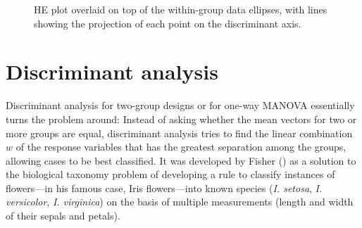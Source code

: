 \documentclass[
  letterpaper,
  10pt,
  krantz2]{krantz}
\makeatletter
\newenvironment{Shaded}{\begin{snugshade}}{\end{snugshade}}
\newcommand{\AttributeTok}[1]{\textcolor[rgb]{0.40,0.45,0.13}{#1}}
\newcommand{\ControlFlowTok}[1]{\textcolor[rgb]{0.00,0.23,0.31}{\textbf{#1}}}
\newcommand{\DecValTok}[1]{\textcolor[rgb]{0.68,0.00,0.00}{#1}}
\newcommand{\FloatTok}[1]{\textcolor[rgb]{0.68,0.00,0.00}{#1}}
\newcommand{\FunctionTok}[1]{\textcolor[rgb]{0.28,0.35,0.67}{#1}}
\newcommand{\NormalTok}[1]{\textcolor[rgb]{0.00,0.23,0.31}{#1}}
\newcommand{\OtherTok}[1]{\textcolor[rgb]{0.00,0.23,0.31}{#1}}
\newcommand{\SpecialCharTok}[1]{\textcolor[rgb]{0.37,0.37,0.37}{#1}}
\newcommand{\StringTok}[1]{\textcolor[rgb]{0.13,0.47,0.30}{#1}}
\newenvironment{kframe}{%
  \medskip{}
  \setlength{\fboxsep}{.8em}
  \def\at@end@of@kframe{}%
  \ifinner\ifhmode%
  \def\at@end@of@kframe{\end{minipage}}%
  \begin{minipage}{\columnwidth}%
  \fi\fi%
  \def\FrameCommand##1{\hskip\@totalleftmargin \hskip-\fboxsep
  \colorbox{shadecolor}{##1}\hskip-\fboxsep
      \hskip-\linewidth \hskip-\@totalleftmargin \hskip\columnwidth}%
  \MakeFramed {\advance\hsize-\width
    \@totalleftmargin\z@ \linewidth\hsize
    \@setminipage}}%
{\par\unskip\endMakeFramed%
  \at@end@of@kframe}
\renewenvironment{Shaded}{\begin{kframe}}{\end{kframe}}
\makeatother
\begin{document}
\begin{Shaded}
\end{Shaded}

\begin{figure}[H]


\caption{\label{fig-mathscore-HE-overlay}HE plot overlaid on top of the
within-group data ellipses, with lines showing the projection of each
point on the discriminant axis.}

\end{figure}%

\section{Discriminant analysis}\label{discriminant-analysis}

Discriminant analysis for two-group designs or for one-way MANOVA
essentially turns the problem around: Instead of asking whether the mean
vectors for two or more groups are equal, discriminant analysis tries to
find the linear combination \(w\) of the response variables that has the
greatest separation among the groups, allowing cases to be best
classified. It was developed by Fisher
() as a solution to the biological
taxonomy problem of developing a rule to classify instances of
flowers---in his famous case, Iris flowers---into known species
(\emph{I. setosa}, \emph{I. versicolor}, \emph{I. virginica}) on the
basis of multiple measurements (length and width of their sepals and
petals).
\end{document}

